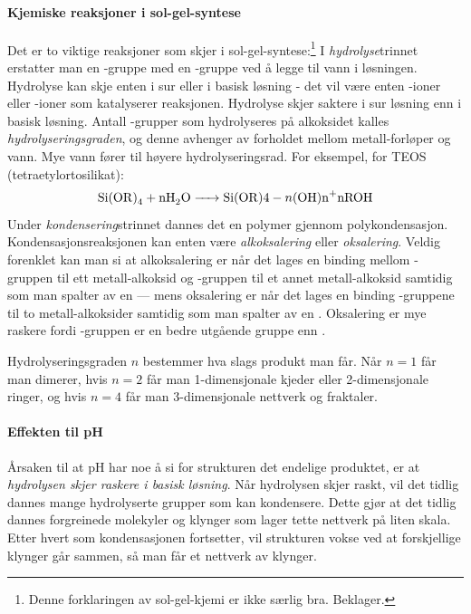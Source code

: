 \paragraph{Kjemiske reaksjoner i sol-gel-syntese} Det er to viktige reaksjoner som skjer i sol-gel-syntese:\footnote{Denne forklaringen av sol-gel-kjemi er ikke særlig bra. Beklager.}
I \emph{hydrolyse}trinnet erstatter man en -gruppe med en -gruppe ved å legge til vann i løsningen. Hydrolyse kan skje enten i sur eller i basisk løsning - det vil være enten -ioner eller -ioner som katalyserer reaksjonen. Hydrolyse skjer saktere i sur løsning enn i basisk løsning. Antall -grupper som hydrolyseres på alkoksidet kalles \emph{hydrolyseringsgraden}, og denne avhenger av forholdet mellom metall-forløper og vann. Mye vann fører til høyere hydrolyseringsrad. For eksempel, for TEOS (tetraetylortosilikat):
\begin{equation}
	\ce{ Si(OR)4 + nH2O -> Si(OR){4-n}(OH)n+nROH }
\end{equation}
Under \emph{kondensering}strinnet dannes det en polymer gjennom polykondensasjon. Kondensasjonsreaksjonen kan enten være \emph{alkoksalering} eller \emph{oksalering}. Veldig forenklet kan man si at alkoksalering er når det lages en binding mellom -gruppen til ett metall-alkoksid og -gruppen til et annet metall-alkoksid samtidig som man spalter av en  --- mens oksalering er når det lages en binding  -gruppene til to metall-alkoksider samtidig som man spalter av en . Oksalering er mye raskere fordi -gruppen er en bedre utgående gruppe enn .

Hydrolyseringsgraden $n$ bestemmer hva slags produkt man får. Når $n=1$ får man dimerer, hvis $n=2$ får man 1-dimensjonale kjeder eller 2-dimensjonale ringer, og hvis $n=4$ får man 3-dimensjonale nettverk og fraktaler. 

\paragraph{Effekten til pH} Årsaken til at pH har noe å si for strukturen det endelige produktet, er at \emph{hydrolysen skjer raskere i basisk løsning}. Når hydrolysen skjer raskt, vil det tidlig dannes mange hydrolyserte grupper som kan kondensere. Dette gjør at det tidlig dannes forgreinede molekyler og klynger som lager tette nettverk på liten skala. Etter hvert som kondensasjonen fortsetter, vil strukturen vokse ved at forskjellige klynger går sammen, så man får et nettverk av klynger.

